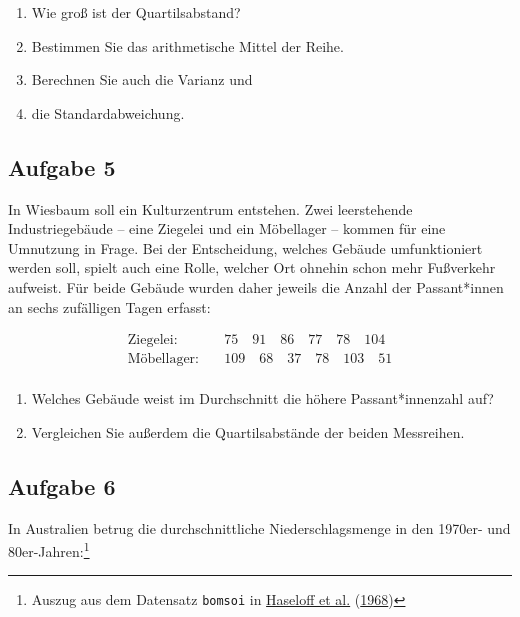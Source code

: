 \documentclass[
  11pt,
  ngerman,
  a4paper,
]{report}
\providecommand{\tightlist}{%
  \setlength{\itemsep}{0pt}\setlength{\parskip}{0pt}}
\begin{document}
\begin{enumerate}
\def\labelenumi{\alph{enumi})}
\tightlist
\item
  Wie groß ist der Quartilsabstand?
\item
  Bestimmen Sie das arithmetische Mittel der Reihe.
\item
  Berechnen Sie auch die Varianz und
\item
  die Standardabweichung.
\end{enumerate}

\hypertarget{ex2-5}{%
\subsection{Aufgabe 5}\label{ex2-5}}

In Wiesbaum soll ein Kulturzentrum entstehen. Zwei leerstehende Industriegebäude -- eine Ziegelei und ein Möbellager -- kommen für eine Umnutzung in Frage. Bei der Entscheidung, welches Gebäude umfunktioniert werden soll, spielt auch eine Rolle, welcher Ort ohnehin schon mehr Fußverkehr aufweist. Für beide Gebäude wurden daher jeweils die Anzahl der Passant*innen an sechs zufälligen Tagen erfasst:

\[\begin{aligned}
\textrm{Ziegelei}: \quad & 75\quad91\quad86\quad77\quad78\quad104\\
\textrm{Möbellager}: \quad & 109\quad68\quad37\quad78\quad103\quad51\\
\end{aligned}\]

\begin{enumerate}
\def\labelenumi{\alph{enumi})}
\item
  Welches Gebäude weist im Durchschnitt die höhere Passant*innenzahl auf?
\item
  Vergleichen Sie außerdem die Quartilsabstände der beiden Messreihen.
\end{enumerate}

\hypertarget{aufgabe-6}{%
\subsection{Aufgabe 6}\label{aufgabe-6}}

In Australien betrug die durchschnittliche Niederschlagsmenge in den 1970er- und 80er-Jahren:\footnote{Auszug aus dem Datensatz \texttt{bomsoi} in \protect\hyperlink{ref-haseloff}{Haseloff et al.} (\protect\hyperlink{ref-haseloff}{1968})}
\nopagebreak
\end{document}
